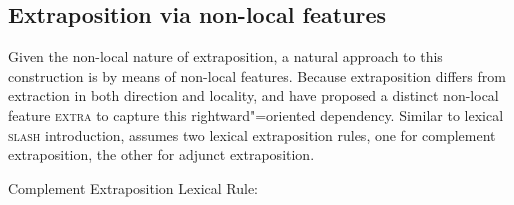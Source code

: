 \documentclass[output=paper,biblatex,babelshorthands,newtxmath,draftmode,colorlinks,citecolor=brown]{langscibook}
\begin{document}
\subsection{Extraposition via non-local features}
\label{udc:sec-extra-feature}

Given the non-local nature of extraposition, a natural approach to
this construction is by means of non-local features. Because
extraposition differs from extraction in both direction and locality,
\citet{Keller:95} and \citet[Section~13.2]{Mueller99a}
have proposed a distinct non-local feature \textsc{extra} to capture
this rightward"=oriented dependency. 
Similar to lexical \textsc{slash} introduction, \citet[]{Keller:95} assumes two lexical
extraposition rules, one for  complement extraposition, the other for
adjunct extraposition. 



\ea
Complement Extraposition Lexical Rule:\\
\end{document}
